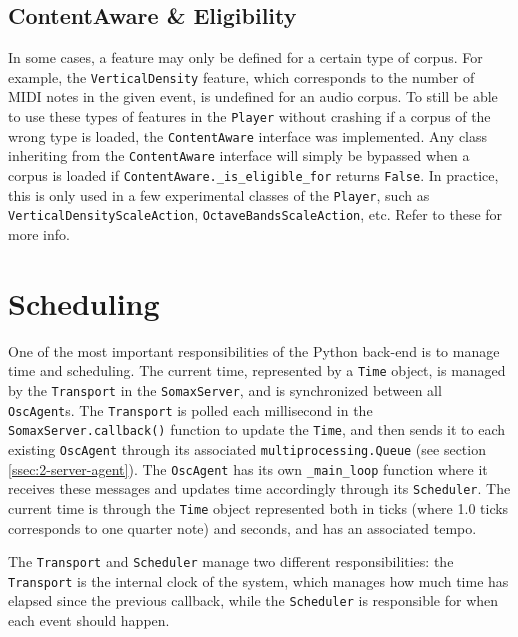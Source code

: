 \subsection{ContentAware \& Eligibility}\label{ssec:2-content-aware}
In some cases, a feature may only be defined for a certain type of corpus. For example, the \texttt{VerticalDensity} feature, which corresponds to the number of MIDI notes in the given event, is undefined for an audio corpus. To still be able to use these types of features in the \texttt{Player} without crashing if a corpus of the wrong type is loaded, the \texttt{ContentAware} interface was implemented. Any class inheriting from the \texttt{ContentAware} interface will simply be bypassed when a corpus is loaded if \texttt{ContentAware.\_is\_eligible\_for} returns \texttt{False}. In practice, this is only used in a few experimental classes of the \texttt{Player}, such as \texttt{VerticalDensityScaleAction}, \texttt{OctaveBandsScaleAction}, etc. Refer to these for more info.



\section{Scheduling}\label{ssec:2-scheduling}
One of the most important responsibilities of the Python back-end is to manage time and scheduling. The current time, represented by a \texttt{Time} object, is managed by the \texttt{Transport} in the \texttt{SomaxServer}, and is synchronized between all \texttt{OscAgent}s. The \texttt{Transport} is polled each millisecond in the \texttt{SomaxServer.callback()} function to update the \texttt{Time}, and then sends it to each existing \texttt{OscAgent} through its associated \texttt{multiprocessing.Queue} (see section \ref{ssec:2-server-agent}). The \texttt{OscAgent} has its own \texttt{\_main\_loop} function where it receives these messages and updates time accordingly through its \texttt{Scheduler}. The current time is through the \texttt{Time} object represented both in ticks (where 1.0 ticks corresponds to one quarter note) and seconds, and has an associated tempo.

The \texttt{Transport} and \texttt{Scheduler} manage two different responsibilities: the \texttt{Transport} is the internal clock of the system, which manages how much time has elapsed since the previous callback, while the \texttt{Scheduler} is responsible for when each event should happen.


